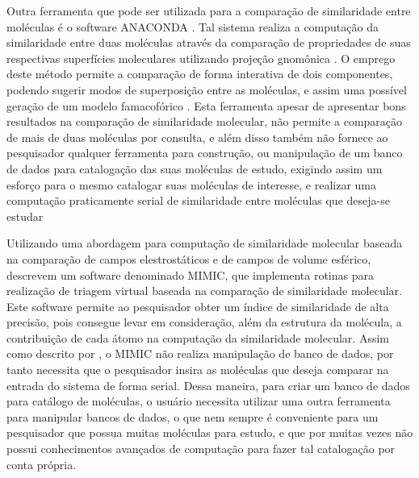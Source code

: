 Outra ferramenta que pode ser utilizada para a comparação de similaridade entre moléculas é o software ANACONDA \cite{devillers1996}. Tal sistema realiza a computação da similaridade entre duas moléculas através da comparação de propriedades de suas respectivas superfícies moleculares utilizando projeção gnomônica . O emprego deste método permite	 a comparação de forma interativa de dois componentes, podendo sugerir modos de superposição entre as moléculas, e assim uma possível geração de um modelo famacofórico \cite{devillers1996}. Esta ferramenta apesar de apresentar bons resultados na comparação de similaridade molecular, não permite a comparação de mais de duas moléculas por consulta, e além disso também não fornece ao pesquisador qualquer ferramenta para construção, ou manipulação de um banco de dados para catalogação das suas moléculas de estudo, exigindo assim um esforço para o mesmo catalogar suas moléculas de interesse, e realizar uma computação praticamente serial de similaridade entre moléculas que deseja-se estudar 

Utilizando uma abordagem para computação de similaridade molecular baseada na comparação de campos elestrostáticos e de campos de volume esférico,  descrevem um software denominado MIMIC, que implementa rotinas para realização de triagem virtual baseada na comparação de similaridade molecular. Este software permite ao pesquisador obter um índice de similaridade de alta precisão, pois consegue levar em consideração, além da estrutura da molécula, a contribuição de cada átomo na computação da similaridade molecular. Assim como descrito por , o MIMIC não realiza manipulação de banco de dados, por tanto necessita que o pesquisador insira as moléculas que deseja comparar na entrada do sistema de forma serial. Dessa maneira, para criar um banco de dados para catálogo de moléculas, o usuário necessita utilizar uma outra ferramenta para manipular bancos de dados, o que nem sempre é conveniente para um pesquisador que possua muitas moléculas para estudo, e que por muitas vezes não possui conhecimentos avançados de computação para fazer tal catalogação por conta própria.

